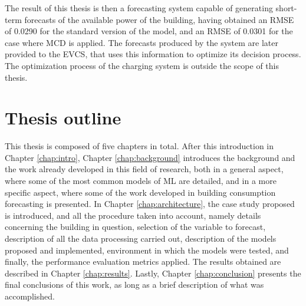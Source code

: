 The result of this thesis is then a forecasting system capable of generating short-term forecasts of the available power of the building, having obtained an \ac{RMSE} of 0.0290 for the standard version of the model, and an \ac{RMSE} of 0.0301 for the case where {MCD} is applied. The forecasts produced by the system are later provided to the \ac{EVCS}, that uses this information to optimize its decision process. The optimization process of the charging system is outside the scope of this thesis.

\section{Thesis outline}

This thesis is composed of five chapters in total. After this introduction in Chapter \ref{chap:intro}, Chapter \ref{chap:background} introduces the background and the work already developed in this field of research, both in a general aspect, where some of the most common models of ML are detailed, and in a more specific aspect, where some of the work developed in building consumption forecasting is presented. In Chapter \ref{chap:architecture}, the case study proposed is introduced, and all the procedure taken into account, namely details concerning the building in question, selection of the variable to forecast, description of all the data processing carried out, description of the models proposed and implemented, environment in which the models were tested, and finally, the performance evaluation metrics applied. The results obtained are described in Chapter \ref{chap:results}. Lastly, Chapter \ref{chap:conclusion} presents the final conclusions of this work, as long as a brief description of what was accomplished.